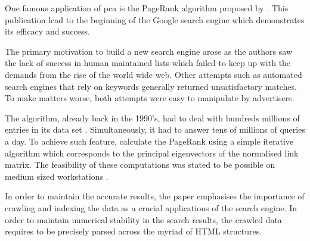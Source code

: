 One famous application of \acrlong{pca} \cite{deisenroth2020mathematics} is the PageRank algorithm proposed by .
This publication lead to the beginning of the Google search engine which demonstrates its efficacy and success.

The primary motivation to build a new search engine arose as the authors saw the lack of success in human maintained lists which failed to keep up with the demands from the rise of the world wide web.
Other attempts such as automated search engines that rely on keywords generally returned unsatisfactory matches.
To make matters worse, both attempts were easy to manipulate by advertisers.
\bigskip


The algorithm, already back in the 1990's, had to deal with hundreds millions of entries in its data set \cite{brin1998anatomy}.
Simultaneously, it had to answer tens of millions of queries a day.
To achieve such feature, \citeauthor{page1999pagerank} calculate the PageRank using a simple iterative algorithm which corresponds to the principal eigenvectors of the normalised link matrix.
The feasibility of these computations was stated to be possible on medium sized workstations \cite{page1999pagerank}.

In order to maintain the accurate results, the paper emphasises the importance of crawling and indexing the data as a crucial applications of the search engine.
In order to maintain numerical stability in the search results, the crawled data requires to be precisely parsed across the myriad of HTML structures.
